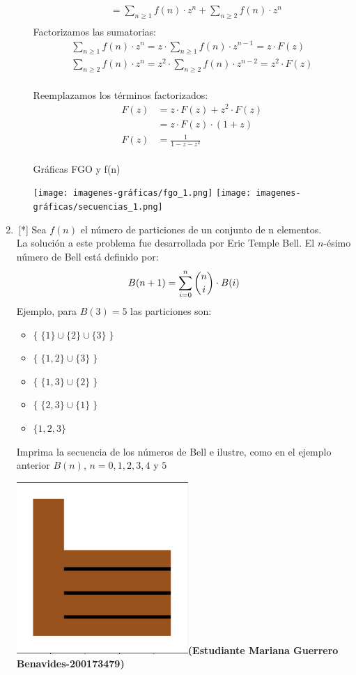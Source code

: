 \begin{enumerate}
\begin{itemize}
\begin{align*}
         &=\sum_{n\geq1} f(n)\cdot z^n + \sum_{n\geq2} f(n)\cdot z^n\\
         \end{align*}
         Factorizamos las sumatorias:
         \begin{align*}
             \sum_{n\geq1} f(n)\cdot z^n = z\cdot \sum_{n\geq1} f(n)\cdot z^{n-1} = z\cdot F(z)\\
             \sum_{n\geq2} f(n)\cdot z^n = z^2\cdot \sum_{n\geq2} f(n)\cdot z^{n-2} = z^2\cdot F(z)
         \end{align*}\\
         Reemplazamos los términos factorizados:
         \begin{align*}
             F(z) &= z\cdot F(z) + z^2\cdot F(z)\\
             &= z\cdot F(z)\cdot (1+z)\\
             F(z) &= \frac{1}{1-z-z^2}
         \end{align*}
         \cite{chatGPT_FGO}
         \\Gráficas FGO y f(n)\\
         \begin{center}
         \texttt{[image: imagenes-gráficas/fgo\_1.png]}
         \texttt{[image: imagenes-gráficas/secuencias\_1.png]}
         \end{center}
     \end{itemize} 
     
    \item\,[*] Sea $f(n)$ el número de particiones de un conjunto de n elementos. \\
    La solución a este problema fue desarrollada por Eric Temple Bell. El $n$-ésimo número de Bell está definido por: $$B(n+1)=\sum_{i=0}^{n}\dbinom{n}{i}\cdot B(i)$$
    Ejemplo, para $B(3)=5$ las particiones son: 
    \begin{itemize}
        \item $\{\; \{1\}\cup \{2\}\cup \{3\}\; \}$
        \item $\{\; \{1, 2\}\cup \{3\} \;\} $
        \item $\{\; \{1, 3\}\cup \{2\}\; \}$
        \item $\{\; \{2, 3\}\cup \{1\}\; \}$
        \item $ \{1, 2, 3\} $
    \end{itemize}
    Imprima la secuencia de los números de Bell e ilustre, como en el ejemplo anterior $B(n),\, n=0,1,2,3,4$ y $5$ 

    \includegraphics[width= 10 mm]{figures/exc.png}\textbf{(Estudiante Mariana Guerrero Benavides-200173479)}
    

\end{enumerate}
